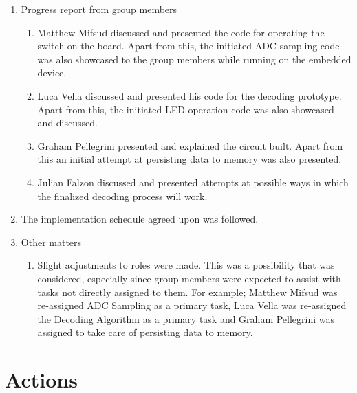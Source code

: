 \documentclass{cce2014-meetings}
\begin{document}
\begin{enumerate}
   \item Progress report from group members
   \begin{enumerate}
      \item Matthew Mifsud discussed and presented the code for operating the switch on the board. Apart from this, the initiated ADC sampling code was also showcased to the group members while running on the embedded device.
      \item Luca Vella discussed and presented his code for the decoding prototype. Apart from this, the initiated LED operation code was also showcased and discussed.
      \item Graham Pellegrini presented and explained the circuit built. Apart from this an initial attempt at persisting data to memory was also presented.
      \item Julian Falzon discussed and presented attempts at possible ways in which the finalized decoding process will work. 
   \end{enumerate}

\item The implementation schedule agreed upon was followed.

\item Other matters
   \begin{enumerate}
   \item Slight adjustments to roles were made. This was a possibility that was considered, especially since group members were expected to assist with tasks not directly assigned to them. For example; Matthew Mifsud was re-assigned ADC Sampling as a primary task, Luca Vella was re-assigned the Decoding Algorithm as a primary task and Graham Pellegrini was assigned to take care of persisting data to memory.
   \end{enumerate}

\end{enumerate}

\section*{Actions}
\end{document}
